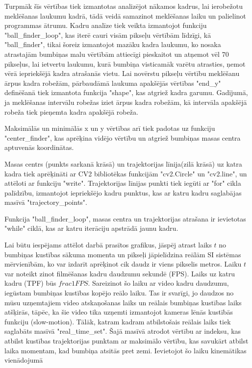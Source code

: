 \documentclass{article}
\begin{document}
Turpmāk šīs vērtības tiek izmantotas analizējot nākamos kadrus, lai ierobežotu meklēšanas laukumu kadrā, tādā veidā samazinot meklēšanas laiku un palielinot programmas ātrumu. Kadru analīze tiek veikta izmantojot funkciju "ball_finder_loop", kas iterē cauri visām pikseļu vērtībām līdzīgi, kā "ball_finder", tikai šoreiz izmantojot mazāku kadra laukumu, ko nosaka atrastajām bumbiņas malu vērtībām attiecīgi pieskaitot un atņemot vēl 70 pikseļus, lai ietvertu laukumu, kurā bumbiņa visticamāk varētu atrasties, ņemot vērā iepriekšējā kadra atrašanās vietu. Lai novērstu pikseļu vērtību meklēšanu ārpus kadra robežām, pārbaudāmā laukuma apakšējās vērtības "end_y" definēšanā tiek izmantota funkcija "shape", kas atgriež kadra garumu. Gadījumā, ja meklēšanas intervālu robežas iziet ārpus kadra robežām, kā intervāla apakšējā robeža tiek pieņemta kadra apakšējā robeža.

Maksimālās un minimālās x un y vērtības arī tiek padotas uz funkciju "center_finder", kas aprēķina vidējo vērtību un atgriež bumbiņas masas centra aptuvenās koordinātas.

Masas centrs (punkts sarkanā krāsā) un trajektorijas līnija(zilā krāsā) uz katra kadra tiek aprēķināti ar CV2 bibliotēkas funkcijām "cv2.Circle" un "cv2.line", un attēloti ar funkciju "write". Trajektorijas līnijas punkti tiek iegūti ar "for" cikla palīdzību, izmantojot iepriekšējo kadru punktus, kas ar katru kadru saglabājas masīvā "trajectory_points".

Funkcija "ball_finder_loop", masas centra un trajektorijas atrašana ir ievietotas "while" ciklā, kas ar katru iterāciju apstrādā jaunu kadru.

Lai būtu iespējams attēlot darbā prasītos grafikus, jāspēj atrast laiks $t$ no bumbiņas kustības sākuma momenta un pikseļi jāpielīdzina reālām SI sistēmas mērvienībām, ko var izdarīt aprēķinot cik daudz ir viens pikselis metros.
Laiku $t$ var noteikt zinot filmēšanas kadru daudzumu sekundē (FPS). Laiks uz katru kadru (TPF) būs $frac{1}{FPS}$.
Sareizinot šo laiku ar video kadru daudzumu, iegūstam bumbiņas kustības kopējo reālo laiku. Tas ir svarīgi, jo daudzos no mūsu uzņemtajiem video atskaņošanas laiks un reālais bumbiņas kustības laiks atšķirās, tāpēc, ka šie video tika uzņemti izmantojot kameras lēnās kustībās funkciju (slow-motion).
Tālāk, katram kadram atbilstošais reālais laiks tiek saglabāts masīvā "real_time_set". Šajā masīvā atrodot vērtību ar indeksu, kas atbilst kustības trajektorijas punktam ar maksimālo vērtību, kas savukārt atbilst laika momentam, kad bumbiņa atsitās pret zemi. 
Ievietojot šo laiku kinemātikas vienādojumā
\end{document}
